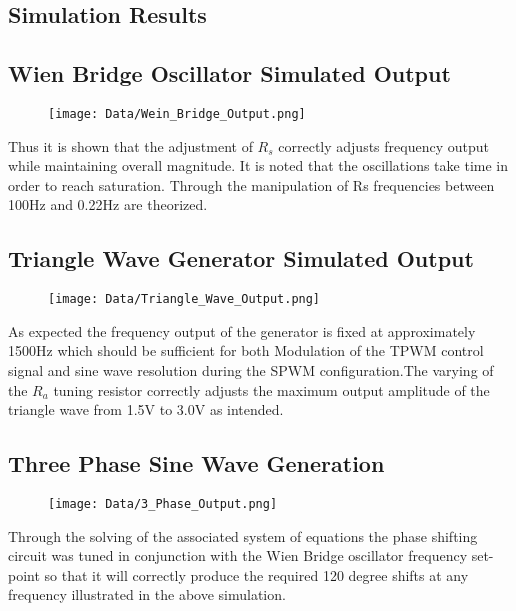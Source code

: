 \documentclass[12pt]{article}
\begin{document}
\begin{appendices}
\pagebreak
\section{Simulation Results}%

\subsection{Wien Bridge Oscillator Simulated Output}%
\begin{figure}[H]
\centering
\texttt{[image: Data/Wein\_Bridge\_Output.png]}
\label{Triangle_Gen_Output}
\end{figure}
Thus it is shown that the adjustment of $R_s$ correctly adjusts frequency output while maintaining overall magnitude. It is noted that the oscillations take time in order to reach saturation. Through the manipulation of Rs frequencies between 100Hz and 0.22Hz are theorized.

\subsection{Triangle Wave Generator Simulated Output}%
\begin{figure}[H]
\centering
\texttt{[image: Data/Triangle\_Wave\_Output.png]}
\label{Triangle_Gen_Output}
\end{figure}
As expected the frequency output of the generator is fixed at approximately 1500Hz which should be sufficient for both Modulation of the TPWM control signal and sine wave resolution during the SPWM configuration.The varying of the $R_a$ tuning resistor correctly adjusts the maximum output amplitude of the triangle wave from 1.5V to 3.0V as intended.

\subsection{Three Phase Sine Wave Generation}%
\begin{figure}[H]
\centering
\texttt{[image: Data/3\_Phase\_Output.png]}
\label{Triangle_Gen_Output}
\end{figure}

Through the solving of the associated system of equations the phase shifting circuit was tuned in conjunction with the Wien Bridge oscillator frequency set-point so that it will correctly produce the required 120 degree shifts at any frequency illustrated in the above simulation.


\end{appendices}
\end{document}
